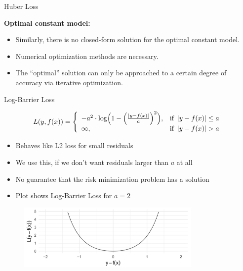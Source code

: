 \begin{vbframe}{Huber Loss}
\vspace*{0.2cm}

\textbf{Optimal constant model:}
\begin{itemize}
\item Similarly, there is no closed-form solution for the optimal constant model. 
\item Numerical optimization methods are necessary. 
\item The \enquote{optimal} solution can only be approached to a certain degree of accuracy via iterative optimization.
\end{itemize}

\end{vbframe}



\begin{vbframe}{Log-Barrier Loss}

\begin{footnotesize}
\[
  L(y, f(x)) = \left\{\begin{array}{lr}
        -a^{2} \cdot \log \Bigl( 1 - \Bigl(\frac{\left|y - f(x)\right|}{a}\Bigr)^2 \Bigr), & \text{if } \left|y-f(x)\right| \leq a \\
        \infty, & \text{if } \left|y-f(x)\right|  > a
        \end{array}\right.
  \]
\end{footnotesize}
\begin{itemize}
\item Behaves like L2 loss for small residuals
\item We use this, if we don't want residuals larger than $a$ at all
\item No guarantee that the risk minimization problem has a solution
\item Plot shows Log-Barrier Loss for $a=2$
\end{itemize}

\begin{figure}
\includegraphics[width = 0.8\textwidth]{figure_man/log-barrier01.png}
\end{figure}


\end{vbframe}




